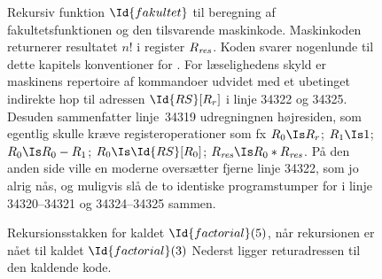 \begin{figure}[t]
  \caption{
    Rekursiv funktion $\Id{fakultet}$ til beregning af fakultetsfunktionen og den tilsvarende maskinkode.
  Maskinkoden returnerer resultatet $n!$ i register $R_{\it res}$.
  Koden svarer nogenlunde til dette kapitels konventioner for .
  For læselighedens skyld er maskinens repertoire af kommandoer udvidet med et ubetinget indirekte hop til adressen $\Id{RS}[R_r]$ i linje 34322 og 34325.
  Desuden sammenfatter linje~34319 udregningnen højresiden, som egentlig skulle kræve register\-operationer som fx  $R_0\Is R_r$; $R_1\Is 1$; $R_0\Is R_0-R_1$; $R_0\Is\Id{RS}[R_0]$; $\Rr\Is R_0*\Rr$.
  På den anden side ville en moderne oversætter fjerne linje 34322, som jo alrig nås, og muligvis slå de to identiske programstumper for \Return{} i linje 34320--34321 og 34324--34325 sammen.}%
\end{figure}
\begin{figure}\sidecaption
\caption{ Rekursionsstakken for kaldet $\Id{factorial}(5)$, når rekursionen er nået til kaldet $\Id{factorial}(3)$ 
  Nederst ligger returadressen til den kaldende kode.}
\end{figure}

